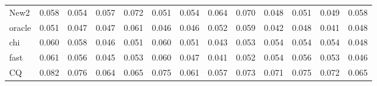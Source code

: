 \documentclass[review]{elsarticle}
\theoremstyle{plain}
\theoremstyle{definition}
\theoremstyle{remark}
\begin{document}
\begin{table}[ht]
\begin{tabular}{lllllllllllll}
New2 & 0.058 & 0.054 & 0.057 & 0.072 & 0.051 & 0.054 & 0.064 & 0.070 & 0.048 & 0.051 & 0.049 & 0.058 \\ 
oracle & 0.051 & 0.047 & 0.047 & 0.061 & 0.046 & 0.046 & 0.052 & 0.059 & 0.042 & 0.048 & 0.041 & 0.048 \\ 
chi & 0.060 & 0.058 & 0.046 & 0.051 & 0.060 & 0.051 & 0.043 & 0.053 & 0.054 & 0.054 & 0.054 & 0.048 \\ 
fast & 0.061 & 0.056 & 0.045 & 0.053 & 0.060 & 0.047 & 0.041 & 0.052 & 0.054 & 0.056 & 0.053 & 0.046 \\ 
CQ & 0.082 & 0.076 & 0.064 & 0.065 & 0.075 & 0.061 & 0.057 & 0.073 & 0.071 & 0.075 & 0.072 & 0.065 \\ 
\bottomrule
\end{tabular}
\end{table}
\end{document}
